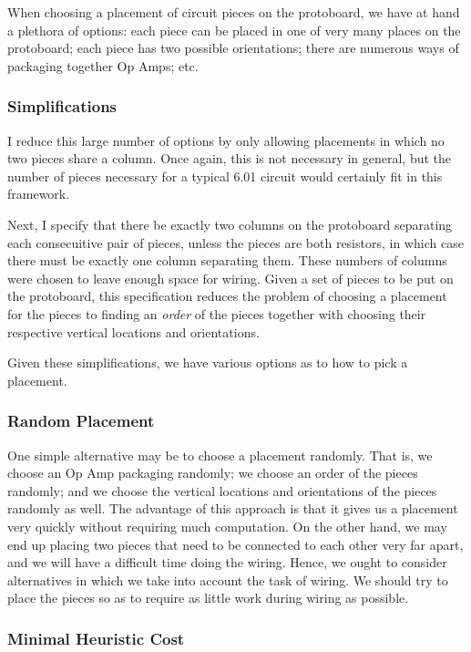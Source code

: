 When choosing a placement of circuit pieces on the protoboard, we have at hand a
plethora of options: each piece can be placed in one of very many places on the
protoboard; each piece has two possible orientations; there are numerous ways of
packaging together Op Amps; etc.

\subsubsection{Simplifications}

I reduce this large number of options by only allowing placements in which no
two pieces share a column. Once again, this is not necessary in general, but the
number of pieces necessary for a typical 6.01 circuit would certainly fit in
this framework.

Next, I specify that there be exactly two columns on the protoboard separating
each consecuitive pair of pieces, unless the pieces are both resistors, in which
case there must be exactly one column separating them. These numbers of columns
were chosen to leave enough space for wiring. Given a set of pieces to be put on
the protoboard, this specification reduces the
problem of choosing a placement for the pieces to finding an \emph{order} of the
pieces together with choosing their respective vertical locations and
orientations.

Given these simplifications, we have various options as to how to pick a
placement.

\subsubsection{Random Placement}

One simple alternative may be to choose a placement randomly. That is, we choose
an Op Amp packaging randomly; we choose an order of the pieces randomly; and we
choose the vertical locations and orientations of the pieces randomly as well.
The advantage of this
approach is that it gives us a placement very quickly without requiring much
computation. On the other hand, we may end up placing two pieces that need to be
connected to each other very far apart, and we will have a difficult time doing
the wiring. Hence, we ought to consider alternatives in which we take into
account the task of wiring. We should try to place the pieces so as to require
as little work during wiring as possible.

\subsubsection{Minimal Heuristic Cost}

